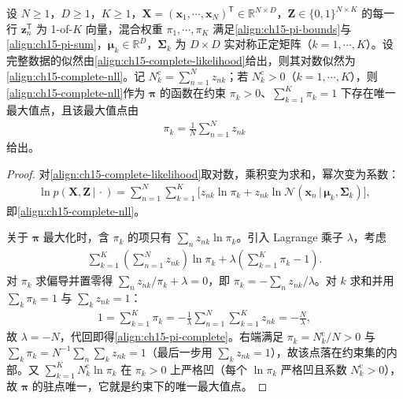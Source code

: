 \documentclass[../../main.tex]{subfiles}
\begin{document}
\begin{proposition}[完全数据的对数似然与混合系数的更新]\label{proposition:ch15-完全数据对数似然}
设 $N\geqslant1$，$D\geqslant1$，$K\geqslant1$，$\bm{X}=(\bm{x}_1,\cdots,\bm{x}_N)^{\mathsf T}\in\mathbb{R}^{N\times D}$，$\bm{Z}\in\{0,1\}^{N\times K}$ 的每一行 $\bm{z}_n^{\mathsf T}$ 为 1-of-$K$ 向量，混合权重 $\pi_1,\cdots,\pi_K$ 满足\eqref{align:ch15-pi-bounds}与\eqref{align:ch15-pi-sum}，$\bm{\mu}_k\in\mathbb{R}^{D}$，$\bm{\Sigma}_k$ 为 $D\times D$ 实对称正定矩阵（$k=1,\cdots,K$）。设完整数据的似然由\eqref{align:ch15-complete-likelihood}给出，则其对数似然为\eqref{align:ch15-complete-nll}。记 $N_k^{\text{c}}=\sum_{n=1}^{N}z_{nk}$；若 $N_k^{\text{c}}>0$（$k=1,\cdots,K$），则\eqref{align:ch15-complete-nll}作为 $\bm{\pi}$ 的函数在约束 $\pi_k>0$、$\sum_{k=1}^{K}\pi_k=1$ 下存在唯一最大值点，且该最大值点由
\begin{align}
\pi_k=\frac{1}{N}\sum_{n=1}^{N}z_{nk}
\label{align:ch15-pi-complete}
\end{align}
给出。
\end{proposition}
\begin{proof}
对\eqref{align:ch15-complete-likelihood}取对数，乘积变为求和，幂次变为系数：
\begin{align*}
\ln p(\bm{X},\bm{Z}\,|\,\cdot)=\sum_{n=1}^{N}\sum_{k=1}^{K}\Big[z_{nk}\ln\pi_k+z_{nk}\ln\mathcal{N}(\bm{x}_n\,|\,\bm{\mu}_k,\bm{\Sigma}_k)\Big],
\end{align*}
即\eqref{align:ch15-complete-nll}。

关于 $\bm{\pi}$ 最大化时，含 $\pi_k$ 的项只有 $\sum_n z_{nk}\ln\pi_k$。引入 Lagrange 乘子 $\lambda$，考虑
\begin{align*}
\sum_{k=1}^{K}\left(\sum_{n=1}^{N}z_{nk}\right)\ln\pi_k+\lambda\left(\sum_{k=1}^{K}\pi_k-1\right).
\end{align*}
对 $\pi_k$ 求偏导并置零得 $\sum_n z_{nk}/\pi_k+\lambda=0$，即 $\pi_k=-\sum_n z_{nk}/\lambda$。对 $k$ 求和并用 $\sum_k\pi_k=1$ 与 $\sum_kz_{nk}=1$：
\begin{align*}
1=\sum_{k=1}^{K}\pi_k=-\frac{1}{\lambda}\sum_{n=1}^{N}\sum_{k=1}^{K}z_{nk}=-\frac{N}{\lambda},
\end{align*}
故 $\lambda=-N$，代回即得\eqref{align:ch15-pi-complete}。右端满足 $\pi_k=N_k^{\text{c}}/N>0$ 与 $\sum_k\pi_k=N^{-1}\sum_n\sum_kz_{nk}=1$（最后一步用 $\sum_kz_{nk}=1$），故该点落在约束集的内部。又 $\sum_{k=1}^{K}N_k^{\text{c}}\ln\pi_k$ 在 $\pi_k>0$ 上严格凹（每个 $\ln\pi_k$ 严格凹且系数 $N_k^{\text{c}}>0$），故 \(\bm{\pi}\) 的驻点唯一，它就是约束下的唯一最大值点。
\end{proof}
\end{document}
